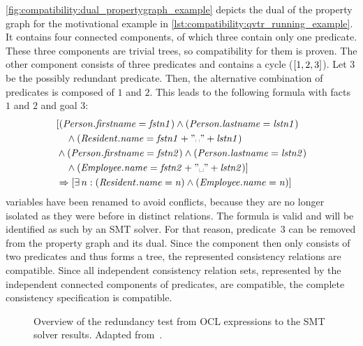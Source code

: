 \begin{example}
\autoref{fig:compatibility:dual_propertygraph_example} depicts the dual of the property graph for the motivational example in \autoref{lst:compatibility:qvtr_running_example}. 
It contains four connected components, of which three contain only one predicate. 
These three components are trivial trees, so compatibility for them is proven.
The other component consists of three predicates and contains a cycle ($[1, 2, 3]$).
Let $3$ be the possibly redundant predicate.
Then, the alternative combination of predicates is composed of $1$ and $2$. 
This leads to the following formula with facts $1$ and $2$ and goal $3$:
\begin{align*}
    &
        [(\propdisplay{Person.firstname} = \mathvariable{fstn1}) \land (\propdisplay{Person.lastname} = \mathvariable{lstn1})\\
    &
        \formulaskip \land (\propdisplay{Resident.name} = \mathvariable{fstn1} + "\text{\textvisiblespace}" + \mathvariable{lstn1}) \\
    & 
        \land 
            (\propdisplay{Person.firstname} = \mathvariable{fstn2}) \land (\propdisplay{Person.lastname} = \mathvariable{lstn2})\\
    &
        \formulaskip \land (\propdisplay{Employee.name} = \mathvariable{fstn2} + "\text{\textvisiblespace}" + \mathvariable{lstn2})]\\
    & 
        \Rightarrow
        [\exists n : (\propdisplay{Resident.name} = \mathvariable{n}) \land (\propdisplay{Employee.name} = \mathvariable{n})]
\end{align*}
\qvtr variables have been renamed to avoid conflicts, because they are no longer isolated as they were before in distinct \qvtr relations.
The formula is valid and will be identified as such by an \gls{SMT} solver.
For that reason, predicate~$3$ can be removed from the property graph and its dual. 
Since the component then only consists of two predicates and thus forms a tree, the represented consistency relations are compatible.
Since all independent consistency relation sets, represented by the independent connected components of predicates, are compatible, the complete consistency specification is compatible.
\end{example}

\begin{figure}
    \centering
    
    \caption[Redundancy test overview]{Overview of the redundancy test from \gls{OCL} expressions to the \gls{SMT} solver results. Adapted from~.}
    \label{fig:compatibility:redundancytest}
\end{figure}

